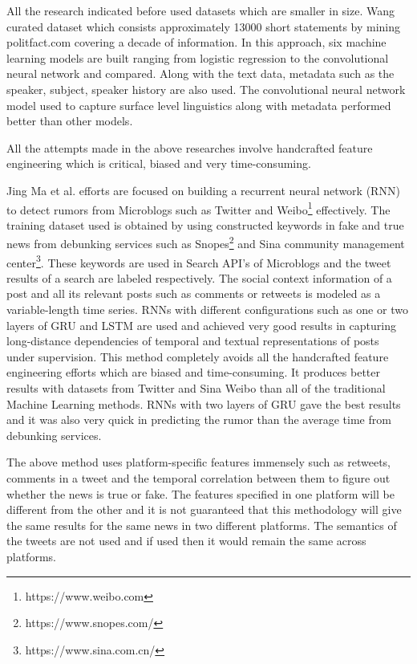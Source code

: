 \documentclass[a4paper, 11pt]{article}
\begin{document}
All the research indicated before used datasets which are smaller in size. Wang \cite{Wang2017} curated dataset which consists approximately 13000 short statements by mining politfact.com covering a decade of information. In this approach, six machine learning models are built ranging from logistic regression to the convolutional neural network and compared. Along with the text data, metadata such as the speaker, subject, speaker history are also used. The convolutional neural network model used to capture surface level linguistics along with metadata performed better than other models.

All the attempts made in the above researches involve handcrafted feature engineering which is critical, biased and very time-consuming.

Jing Ma et al.\cite{Ma} efforts are focused on building a recurrent neural network (RNN) to detect rumors from Microblogs such as Twitter and Weibo\footnote{https://www.weibo.com} effectively. The training dataset used is obtained by using constructed keywords in fake and true news from debunking services such as Snopes\footnote{https://www.snopes.com/} and Sina community management center\footnote{https://www.sina.com.cn/}. These keywords are used in Search API's of Microblogs and the tweet results of a search are labeled respectively. The social context information of a post and all its relevant posts such as comments or retweets is modeled as a variable-length time series. RNNs with different configurations such as one or two layers of GRU and LSTM are used and achieved very good results in capturing long-distance dependencies of temporal and textual representations of posts under supervision. This method completely avoids all the handcrafted feature engineering efforts which are biased and time-consuming. It produces better results with datasets from Twitter and Sina Weibo than all of the traditional Machine Learning methods. RNNs with two layers of GRU gave the best results and it was also very quick in predicting the rumor than the average time from debunking services.

The above method uses platform-specific features immensely such as retweets, comments in a tweet and the temporal correlation between them to figure out whether the news is true or fake. The features specified in one platform will be different from the other and it is not guaranteed that this methodology will give the same results for the same news in two different platforms. The semantics of the tweets are not used and if used then it would remain the same across platforms. 
\end{document}
